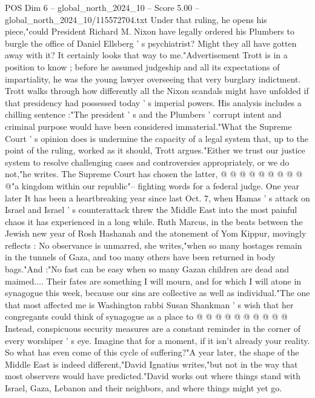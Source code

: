 \begin{textsample}{POS Dim 6 – global\_north\_2024\_10 – Score 5.00 – global\_north\_2024\_10/115572704.txt}  \label{ex:f6_pos_397}
Under that ruling, he opens his piece,"could President Richard M.
Nixon have legally ordered his Plumbers to burgle the office of Daniel Ellsberg ' s psychiatrist?
Might they all have gotten away with it?
It certainly looks that way to me."Advertisement Trott is in a position to know ; before he assumed judgeship and all its expectations of impartiality, he was the young lawyer overseeing that very burglary indictment.
Trott walks through how differently all the Nixon scandals might have unfolded if that presidency had possessed today ' s imperial powers.
His analysis includes a chilling sentence :"The president ' s and the Plumbers ' corrupt intent and criminal purpose would have been considered immaterial."What the Supreme Court ' s opinion does is undermine the capacity of a legal system that, up to the point of the ruling, worked as it should, Trott argues."Either we trust our justice system to resolve challenging cases and controversies appropriately, or we do not,"he writes.
The Supreme Court has chosen the latter, @ @ @ @ @ @ @ @ @ @"a kingdom within our republic"-- fighting words for a federal judge.
One year later It has been a heartbreaking year since last Oct. 7, when Hamas ' s attack on Israel and Israel ' s counterattack threw the Middle East into the most painful chaos it has experienced in a long while.
Ruth Marcus, in the beats between the Jewish new year of Rosh Hashanah and the atonement of Yom Kippur, movingly reflects : No observance is unmarred, she writes,"when so many hostages remain in the tunnels of Gaza, and too many others have been returned in body bags."And :"No fast can be easy when so many Gazan children are dead and maimed....
Their fates are something I will mourn, and for which I will atone in synagogue this week, because our sins are collective as well as individual."The one that most affected me is Washington rabbi Susan Shankman ' s wish that her congregants could think of synagogue as a place to @ @ @ @ @ @ @ @ @ @ Instead, conspicuous security measures are a constant reminder in the corner of every worshiper ' s eye.
Imagine that for a moment, if it isn't already your reality.
So what has even come of this cycle of suffering?"A year later, the shape of the Middle East is indeed different,"David Ignatius writes,"but not in the way that most observers would have predicted."David works out where things stand with Israel, Gaza, Lebanon and their neighbors, and where things might yet go.

\end{textsample}
